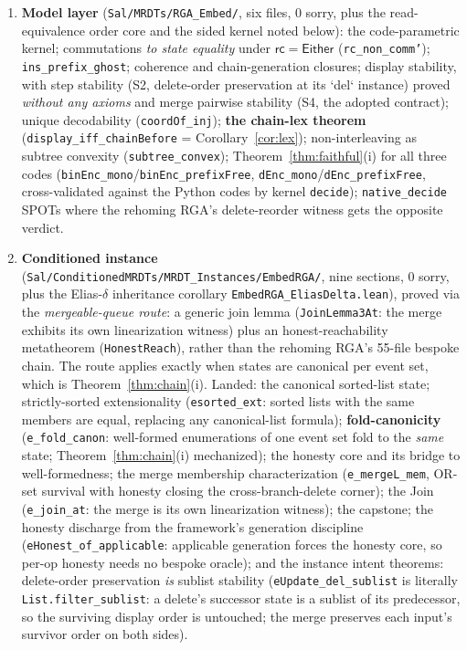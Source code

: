 \documentclass[11pt]{article}
\newcommand{\rc}{\mathsf{rc}}
\newcommand{\Either}{\textsf{Either}}
\newcommand{\code}[1]{\texttt{#1}}
\begin{document}
\begin{enumerate}
\item \textbf{Model layer} (\code{Sal/MRDTs/RGA\_Embed/}, six
files, 0 sorry, plus the read-equivalence order core and the sided
kernel noted below): the code-parametric kernel; commutations \emph{to
state equality} under $\rc = \Either$ (\code{rc\_non\_comm'});
\code{ins\_prefix\_ghost}; coherence and chain-generation closures;
display stability, with step stability (S2, delete-order preservation at
its `del` instance) proved \emph{without any axioms} and merge pairwise
stability (S4, the adopted contract); unique decodability
(\code{coordOf\_inj}); \textbf{the chain-lex theorem}
(\code{display\_iff\_chainBefore} = Corollary~\ref{cor:lex});
non-interleaving as subtree convexity (\code{subtree\_convex});
Theorem~\ref{thm:faithful}(i) for all three codes
(\code{binEnc\_mono}/\code{binEnc\_prefixFree},
\code{dEnc\_mono}/\code{dEnc\_prefixFree}, cross-validated
against the Python codes by kernel \code{decide});
\code{native\_decide} SPOTs where the rehoming RGA's delete-reorder
witness gets the opposite verdict.
\item \textbf{Conditioned instance}
(\code{Sal/ConditionedMRDTs/MRDT\_Instances/EmbedRGA/}, nine
sections, 0 sorry, plus the Elias-$\delta$ inheritance corollary
\code{EmbedRGA\_EliasDelta.lean}), proved via the \emph{mergeable-queue route}: a
generic join lemma (\code{JoinLemma3At}: the merge exhibits its own
linearization witness) plus an honest-reachability metatheorem
(\code{HonestReach}), rather than the rehoming RGA's 55-file bespoke
chain. The route applies exactly when states are canonical per event
set, which is Theorem~\ref{thm:chain}(i).
Landed: the canonical sorted-list state; strictly-sorted
extensionality (\code{esorted\_ext}: sorted lists with the same
members are equal, replacing any canonical-list formula);
\textbf{fold-canonicity} (\code{e\_fold\_canon}: well-formed
enumerations of one event set fold to the \emph{same} state;
Theorem~\ref{thm:chain}(i) mechanized); the honesty core and its
bridge to well-formedness; the merge membership characterization
(\code{e\_mergeL\_mem}, OR-set survival with honesty closing the
cross-branch-delete corner); the Join (\code{e\_join\_at}: the
merge is its own linearization witness); the capstone; the honesty
discharge from the framework's generation discipline
(\code{eHonest\_of\_applicable}: applicable generation forces the
honesty core, so per-op honesty needs no bespoke oracle); and the
instance intent theorems: delete-order preservation \emph{is}
sublist stability (\code{eUpdate\_del\_sublist} is literally
\code{List.filter\_sublist}: a delete's successor state is a sublist
of its predecessor, so the surviving display order is untouched;
the merge preserves each input's survivor order on both sides).
\end{enumerate}
\end{document}
